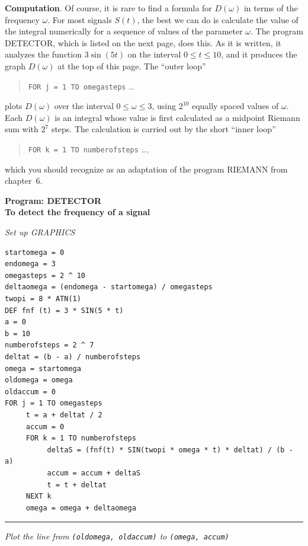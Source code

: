 {{{{{\bf Computation}.  Of course, it is rare to find a formula for $D(\omega)$ in terms of the frequency $\omega$.  For most signals $S(t)$, the best we can do is calculate the value of the integral numerically for a sequence of values of the parameter $\omega$.  The program DETECTOR, 
which is listed on the next page, does this.  As it is written, it analyzes the function $3\sin(5t)$ on the interval $0 \leq t \leq 10$, and it produces the graph $D(\omega)$ at the top of this page.  The ``outer loop'' 
	\begin{quote}
	{\tt FOR j = 1 TO omegasteps} \quad \ldots {}
	\end{quote}
plots $D(\omega)$ over the interval $0 \leq \omega \leq 3$, using $2^{10}$ equally spaced values of $\omega$.  Each $D(\omega)$ is an integral whose value is first calculated as a midpoint Riemann sum with $2^7$ steps.  The calculation is carried out by the short ``inner loop''  
	\begin{quote}
	{\tt FOR k = 1 TO numberofsteps} \quad \ldots {},
	\end{quote}
which you should recognize as an adaptation of the program RIEMANN from chapter~6.  


\begin{center}

{\bf Program: DETECTOR \\  
To detect the frequency of a signal}
\end{center}

\footnotesize
\hspace{-20pt}
\noindent
{\sl Set up GRAPHICS}
\vspace{-11pt}
\begin{verbatim}
startomega = 0
endomega = 3
omegasteps = 2 ^ 10
deltaomega = (endomega - startomega) / omegasteps
twopi = 8 * ATN(1)
DEF fnf (t) = 3 * SIN(5 * t)
a = 0
b = 10
numberofsteps = 2 ^ 7
deltat = (b - a) / numberofsteps
omega = startomega
oldomega = omega
oldaccum = 0
FOR j = 1 TO omegasteps
     t = a + deltat / 2
     accum = 0
     FOR k = 1 TO numberofsteps
          deltaS = (fnf(t) * SIN(twopi * omega * t) * deltat) / (b - a)
          accum = accum + deltaS
          t = t + deltat
     NEXT k
     omega = omega + deltaomega
\end{verbatim}

\vspace{-10pt}
\rule{23pt}{0pt} {\sl Plot the line from {\tt (oldomega, oldaccum)} to {\tt (omega, accum)}}

}}}}
